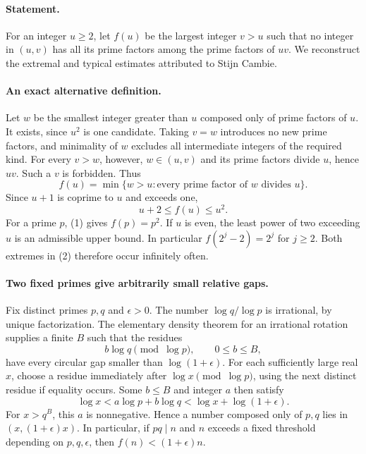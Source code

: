 \paragraph{Statement.}
For an integer \(u\geq2\), let \(f(u)\) be the largest integer \(v>u\)
such that no integer in \((u,v)\) has all its prime factors among the
prime factors of \(uv\). We reconstruct the extremal and typical
estimates attributed to Stijn Cambie.

\paragraph{An exact alternative definition.}
Let \(w\) be the smallest integer greater than \(u\) composed only of
prime factors of \(u\). It exists, since \(u^2\) is one candidate.
Taking \(v=w\) introduces no new prime factors, and minimality of \(w\)
excludes all intermediate integers of the required kind.
For every \(v>w\), however, \(w\in(u,v)\) and its prime factors divide
\(u\), hence \(uv\). Such a \(v\) is forbidden. Thus
\[
 f(u)=\min\{w>u:\text{every prime factor of }w\text{ divides }u\}.
 \tag{1}
\]
Since \(u+1\) is coprime to \(u\) and exceeds one,
\[
 u+2\leq f(u)\leq u^2.
 \tag{2}
\]
For a prime \(p\), (1) gives \(f(p)=p^2\). If \(u\) is even,
the least power of two exceeding \(u\) is an admissible upper bound.
In particular \(f(2^j-2)=2^j\) for \(j\geq2\).
Both extremes in (2) therefore occur infinitely often.

\paragraph{Two fixed primes give arbitrarily small relative gaps.}
Fix distinct primes \(p,q\) and \(\epsilon>0\).
The number \(\log q/\log p\) is irrational, by unique factorization.
The elementary density theorem for an irrational rotation supplies a
finite \(B\) such that the residues
\[
 b\log q\pmod{\log p},\qquad 0\leq b\leq B,
\]
have every circular gap smaller than \(\log(1+\epsilon)\).
For each sufficiently large real \(x\), choose a residue immediately
after \(\log x\pmod{\log p}\), using the next distinct residue if
equality occurs. Some \(b\leq B\) and integer \(a\) then satisfy
\[
 \log x<a\log p+b\log q<\log x+\log(1+\epsilon).
\]
For \(x>q^B\), this \(a\) is nonnegative. Hence a number composed
only of \(p,q\) lies in \((x,(1+\epsilon)x)\).
In particular, if \(pq\mid n\) and \(n\) exceeds a fixed threshold
depending on \(p,q,\epsilon\), then \(f(n)<(1+\epsilon)n\).

